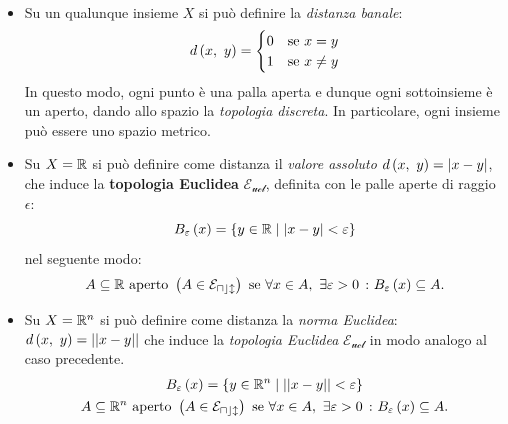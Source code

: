 \begin{example}~{}
	\begin{itemize}
		\item Su un qualunque insieme $X$ si può definire la \textit{distanza banale}:
		\begin{equation}
			d\left(x,\ y\right)=\begin{cases} 
				0 & \text{se }x=y\\
				1 & \text{se }x\neq y
			\end{cases}
		\end{equation}
		In questo modo, ogni punto è una palla aperta e dunque ogni sottoinsieme è un aperto, dando allo spazio la \textit{topologia discreta}. In particolare, ogni insieme può essere uno spazio metrico.
		\item Su $X=\mathbb{R}$ si può definire come distanza il \textit{valore assoluto} $d\left(x,\ y\right)=|x-y|$, che induce la \textbf{topologia Euclidea} $\mathcal{E_{ucl}}$, definita con le palle aperte di raggio $\epsilon$:
		\begin{equation}
			B_{\varepsilon}\left(x\right)=\left\{y\in \mathbb{R}\mid |x-y|<\varepsilon\right\}
		\end{equation}
		nel seguente modo:
		\begin{equation*}
			A\subseteq \mathbb{R} \text{ aperto } \left(A\in\mathcal{E_{ucl}}\right) \text{ se } \forall x\in A,\ \exists \varepsilon>0\ \colon B_{\varepsilon}\left(x\right)\subseteq A.
		\end{equation*}
		\item Su $X=\mathbb{R}^n$ si può definire come distanza la \textit{norma Euclidea}: $d\left(x,\ y\right)=||x-y||$ che induce la \textit{topologia Euclidea} $\mathcal{E_{ucl}}$ in modo analogo al caso precedente.
		\begin{gather*}
			B_{\varepsilon}\left(x\right)=\left\{y\in \mathbb{R}^n\mid ||x-y||<\varepsilon\right\}\\
			A\subseteq \mathbb{R}^n \text{ aperto } \left(A\in\mathcal{E_{ucl}}\right) \text{ se } \forall x\in A,\ \exists \varepsilon>0\ \colon B_{\varepsilon}\left(x\right)\subseteq A.
		\end{gather*}
	\end{itemize}
\end{example}
